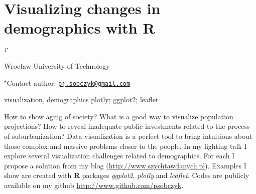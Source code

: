 \documentclass[\main/boa.tex]{subfiles}
\begin{document}
\section{Visualizing changes in demographics with R}

\begin{center}
  {\bf {}$^{1^\star}$}
\end{center}

\vskip 0.3cm

\begin{affiliations}
\begin{enumerate}
\begin{minipage}{0.915\textwidth}
\centering
\item Wrocław University of Technology \\[-2pt]
\end{minipage}
\end{enumerate}
$^\star$Contact author: \href{mailto:pj.sobczyk@gmail.com}{\nolinkurl{pj.sobczyk@gmail.com}}\\
\end{affiliations}

\vskip 0.5cm

\begin{minipage}{0.915\textwidth}
\keywords visualization, demographics
\packages plotly; ggplot2; leaflet
\end{minipage}

\vskip 0.8cm

How to show aging of society? What is a good way to visualize population
projections? How to reveal inadequate public investments related to the
process of suburbanization? Data visualization is a perfect tool to
bring intuitions about those complex and massive problems closer to the
people. In my lighting talk I explore several visualization challenges
related to demographics. For each I propose a solution from my blog
(\url{http://www.szychtawdanych.pl}). Examples I show are created with
\textbf{R} packages \emph{ggplot2}, \emph{plotly} and \emph{leaflet}.
Codes are publicly available on my github
\url{http://www.github.com/psobczyk}.
\end{document}
